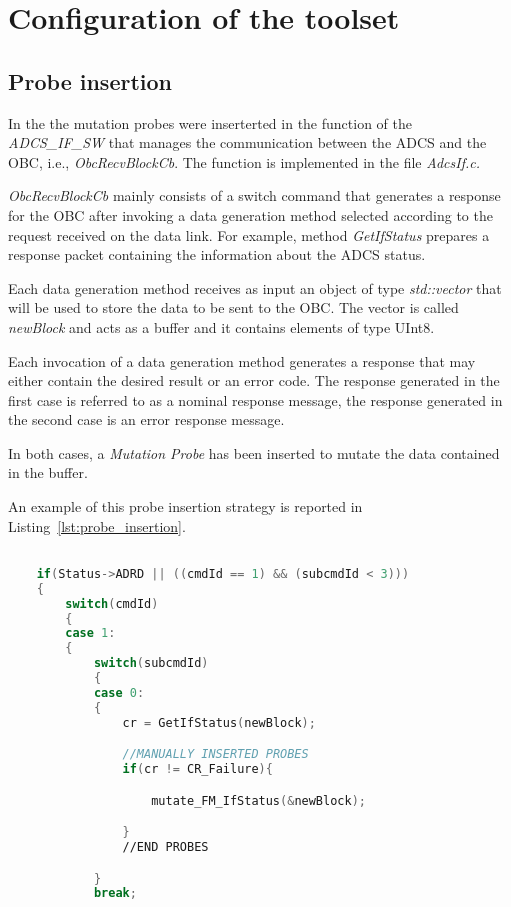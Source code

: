 
\chapter{Configuration of the toolset}

\section{Probe insertion}

In the \case the mutation probes were inserterted in the function of the \emph{ADCS\_IF\_SW} that manages the communication between the ADCS and the OBC, i.e., \emph{ObcRecvBlockCb}. The function is implemented in the file \emph{AdcsIf.c.}

\emph{ObcRecvBlockCb} mainly consists of a switch command that generates a response for the OBC after invoking a data generation method selected according to the request received on the data link. For example, method \emph{GetIfStatus} prepares a response packet containing the information about the ADCS status.

Each data generation method receives as input an object of type \emph{std::vector} that will be used to store the data to be sent to the OBC. The vector is called \emph{newBlock} and acts as a buffer and it contains elements of type UInt8.

Each invocation of a data generation method generates a response that may either contain the desired result or an error code. The response generated in the first case is referred to as a nominal response message, the response generated in the second case is an error response message.

In both cases, a \emph{Mutation Probe} has been inserted to mutate the data contained in the buffer.

An example of this probe insertion strategy is reported in Listing~\ref{lst:probe_insertion}.

\begin{lstlisting}[language=C++, caption=Probe insertion Strategy, label={lst:probe_insertion}]

    if(Status->ADRD || ((cmdId == 1) && (subcmdId < 3)))
    {
        switch(cmdId)
        {
        case 1:
        {
            switch(subcmdId)
            {
            case 0:
            {
                cr = GetIfStatus(newBlock);

                //MANUALLY INSERTED PROBES
                if(cr != CR_Failure){

      		        mutate_FM_IfStatus(&newBlock);

                }
                //END PROBES

            }
            break;

\end{lstlisting}

